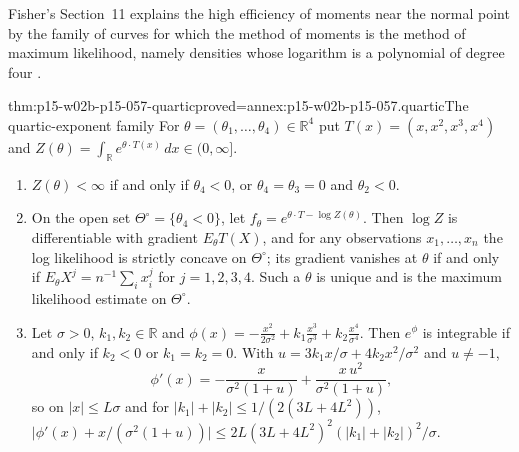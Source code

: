 Fisher's Section~11 explains the high efficiency of moments near the normal
point by the family of curves for which the method of moments is the
method of maximum likelihood, namely densities whose logarithm is a
polynomial of degree four \cite[pp.~355--356]{Fisher1922Foundations}.

\begin{hbtheorem}{thm:p15-w02b-p15-057-quartic}{proved=annex:p15-w02b-p15-057.quartic}{The quartic-exponent family}
For \(\theta=(\theta_1,\ldots,\theta_4)\in\mathbb R^4\) put
\(T(x)=(x,x^2,x^3,x^4)\) and \(Z(\theta)=\int_{\mathbb R}e^{\theta\cdot
T(x)}\,dx\in(0,\infty]\).
\begin{enumerate}
\item \(Z(\theta)<\infty\) if and only if \(\theta_4<0\), or
 \(\theta_4=\theta_3=0\) and \(\theta_2<0\).
\item On the open set \(\Theta^\circ=\{\theta_4<0\}\), let
 \(f_\theta=e^{\theta\cdot T-\log Z(\theta)}\). Then \(\log Z\) is
 differentiable with gradient \(E_\theta T(X)\), and for any observations
 \(x_1,\ldots,x_n\) the log likelihood
 is strictly concave on \(\Theta^\circ\); its gradient vanishes at
 \(\theta\) if and only if \(E_\theta X^j=n^{-1}\sum_ix_i^j\) for
 \(j=1,2,3,4\). Such a \(\theta\) is unique and is the maximum likelihood
 estimate on \(\Theta^\circ\).
\item Let \(\sigma>0\), \(k_1,k_2\in\mathbb R\) and
 \(\phi(x)=-\frac{x^2}{2\sigma^2}+k_1\frac{x^3}{\sigma^3}
 +k_2\frac{x^4}{\sigma^4}\). Then \(e^\phi\) is integrable if and only if
 \(k_2<0\) or \(k_1=k_2=0\). With
 \(u=3k_1x/\sigma+4k_2x^2/\sigma^2\) and \(u\neq-1\),
 \[
  \phi'(x)=-\frac{x}{\sigma^2(1+u)}+\frac{x\,u^2}{\sigma^2(1+u)} ,
 \]
 so on \(|x|\leq L\sigma\) and for \(|k_1|+|k_2|\leq1/(2(3L+4L^2))\),
 \(\bigl|\phi'(x)+x/(\sigma^2(1+u))\bigr|\leq
 2L(3L+4L^2)^2(|k_1|+|k_2|)^2/\sigma\).
\end{enumerate}
\end{hbtheorem}

